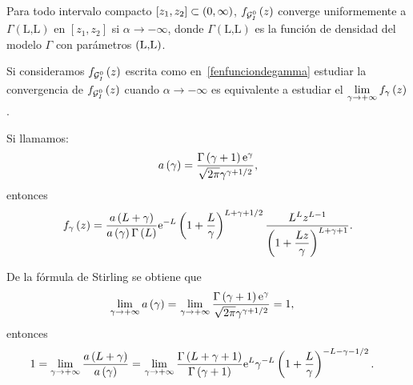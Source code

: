 \begin{proposition}
	\label{conv1}
	Para todo intervalo compacto $[z_{1},z_{2}]\subset\left( 0,\infty \right)$, $f_{\mathcal{G}_I^0}\left( z \right)$ converge
	uniformemente a $\Gamma(\text{L,L})$ en $[z_{1},z_{2}]$ si $\alpha\to -\infty$,
	donde $\Gamma(\text{L,L})$ es la función de densidad del modelo $\Gamma$ con parámetros $\left( \text{L,L} \right)$.
\end{proposition}

\begin{dem}
Si consideramos $f_{\mathcal{G}_I^0}\left( z \right)$ escrita como en~\eqref{fenfunciondegamma} estudiar la convergencia de $f_{\mathcal{G}_I^0}\left( z \right)$ cuando $\alpha\to -\infty$ es equivalente a estudiar el $\lim\limits_{\gamma\to+\infty} f_{\gamma}\left( z \right)$. 
		
Si llamamos:
	\begin{align*}
		a\left( \gamma \right) &= \frac{\Gamma\left( \gamma+1 \right)\mathrm{e}^{\gamma}}{\sqrt{2\pi}\gamma^{\gamma+1/2}},\\
	\end{align*}
entonces 
\begin{align}
\label{GIOfunciongamma}
f_{\gamma}\left( z \right) = \frac{a\left( L+\gamma \right)}{a\left( \gamma \right)\Gamma\left( L \right)}\mathrm{e}^{-L}\left( 1+\frac{L}{\gamma} \right)^{L+\gamma+1/2} \dfrac{L^L z^{L-1}}{\left(1+\dfrac{L z}{\gamma}\right)^{L+\gamma +1}}.
\end{align}


De la fórmula de Stirling se obtiene que
	\begin{align*}
	\lim_{\gamma\to+\infty} a\left( \gamma \right) = 
	&\, \lim_{\gamma\to+\infty}\frac{\Gamma\left( \gamma+1 \right)\mathrm{e}^{\gamma}}{\sqrt{2\pi}\gamma^{\gamma+1/2}} = 1,
	\end{align*}
entonces
	\begin{align*}
	1=\lim_{\gamma\to+\infty} \frac{a\left( L+\gamma \right)}{a\left( \gamma \right)} = 
	&\, \lim_{\gamma\to+\infty}\frac{\Gamma\left( L+\gamma+1 \right)}{\Gamma\left( \gamma+1 \right)}
	\mathrm{e}^{L}\gamma^{-L}\left( 1+\frac{L}{\gamma} \right)^{-L-\gamma-1/2}.
	\end{align*}


\end{dem}
